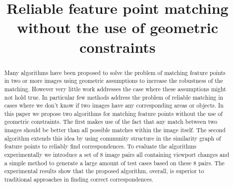 \documentclass[12pt,journal]{IEEEtran}
\begin{document}
\title{Reliable feature point matching without the use of geometric 
constraints}

\maketitle
%
\begin{abstract}
Many algorithms have been proposed to solve the problem of matching 
feature points in two or more images using geometric assumptions to 
increase the robustness of the matching. However very little work 
addresses the case where these assumptions might not hold true. In 
particular few methods address the problem of reliable matching in cases 
where we don't know if two images have any corresponding areas or 
objects. In this paper we propose two algorithms for matching feature 
points without the use of geometric constraints. The first makes use of 
the fact that any match between two images should be better than all 
possible matches within the image itself. The second algorithm extends 
this idea by using community structure in the similarity graph of 
feature points to reliably find correspondences. To evaluate the 
algorithms experimentally we introduce a set of 8 image pairs all 
containing viewport changes and a simple method to generate a large 
amount of test cases based on these 8 pairs. The experimental results 
show that the proposed algorithm, overall, is superior to traditional 
approaches in finding correct correspondences.
\end{abstract}
%
\end{document}

